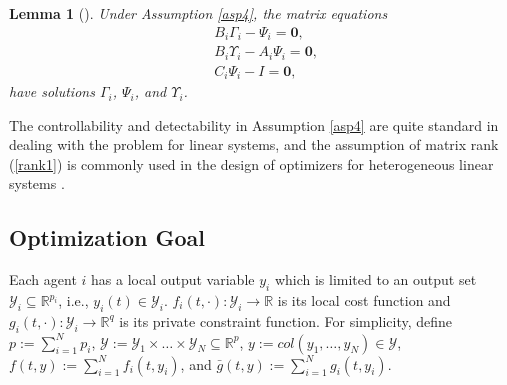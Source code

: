 \documentclass[final,5p,times,twocolumn,authoryear]{elsarticle}
\newtheorem{lemma}{ {Lemma}}
\begin{document}
	\begin{lemma} [\citet{lzh2020}]\label{lemma3}
		Under Assumption \ref{asp4}, the matrix equations
		\begin{subequations}\label{eqle3}
			\begin{align}
				&B_i\Gamma_i-\Psi_i=\boldsymbol{0},\label{eqle31}\\
				&B_i\Upsilon_i-A_i\Psi_i=\boldsymbol{0},\label{eqle32}\\
				&C_i\Psi_i-I=\boldsymbol{0},\label{eqle33}
			\end{align}
		\end{subequations}
		have solutions $\Gamma_i$, $\Psi_i$, and $\Upsilon_i$.
	\end{lemma}
	
	\begin{remark}
		 The controllability and detectability in Assumption \ref{asp4} are quite standard in dealing with the problem for linear systems, and the assumption of matrix rank (\ref{rank1}) is commonly used in the design of optimizers for heterogeneous linear systems \citep{lzh2020, yu2021a}.
	\end{remark}

\subsection{Optimization Goal}
	Each agent $i$ has a local output variable $y_i$ which is limited to an output set $\mathcal{Y}_i \subseteq \mathbb{R}^{p_i}$, i.e., $y_i(t)\in\mathcal{Y}_i$.
	$f_i(t,\cdot): \mathcal{Y}_i\to \mathbb{R}$ is its local cost function
	and $g_i(t,\cdot): \mathcal{Y}_i\to \mathbb{R}^{q}$ is its private constraint function. 
	For simplicity, define $p:=\sum_{i=1}^{N}p_i$, $\mathcal{Y}:=\mathcal{Y}_1\times\dots \times \mathcal{Y}_N \subseteq \mathbb{R}^{p}$, $y:=col(y_1,\dots, y_N)\in\mathcal{Y}$, $f(t,y):=\sum_{i=1}^{N}f_{i}(t, y_i)$, and 
	$\bar g(t,y):=\sum_{i=1}^N g_{i}(t, y_i)$.
	
\end{document}
